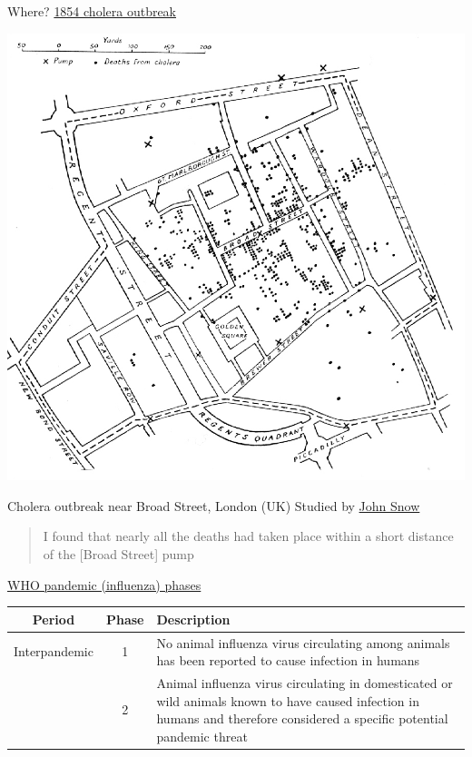 \documentclass[aspectratio=169]{beamer}\usepackage[]{graphicx}\usepackage[]{xcolor}
\begin{document}
\begin{frame}{Where? \href{https://en.wikipedia.org/wiki/1854_Broad_Street_cholera_outbreak}{1854 cholera outbreak}}
    \begin{minipage}{0.5\textwidth}
    \includegraphics[width=\textwidth]{FIGS/Snow-cholera-map.jpg}
    \end{minipage}
    \begin{minipage}{0.45\textwidth}
        Cholera outbreak near Broad Street, London (UK)
        \vfill
        Studied by \href{https://en.wikipedia.org/wiki/John_Snow}{John Snow}

        \begin{quotation}
            I found that nearly all the deaths had taken place within a short distance of the [Broad Street] pump    
        \end{quotation}
            \end{minipage}
\end{frame}


\begin{frame}{\href{https://www.ncbi.nlm.nih.gov/books/NBK143061/}{WHO pandemic (influenza) phases}}
\begin{tabular}{ccp{6cm}}
Period & Phase & Description \\
\hline
\rowcolor{lgreen} Interpandemic & 1 & No animal influenza virus circulating among animals has been reported to cause infection in humans \\
\rowcolor{lgreen} & 2 & Animal influenza virus circulating in domesticated or wild animals known to have caused infection in humans and therefore considered a specific potential pandemic threat
\end{tabular}
\end{frame}
\end{document}
